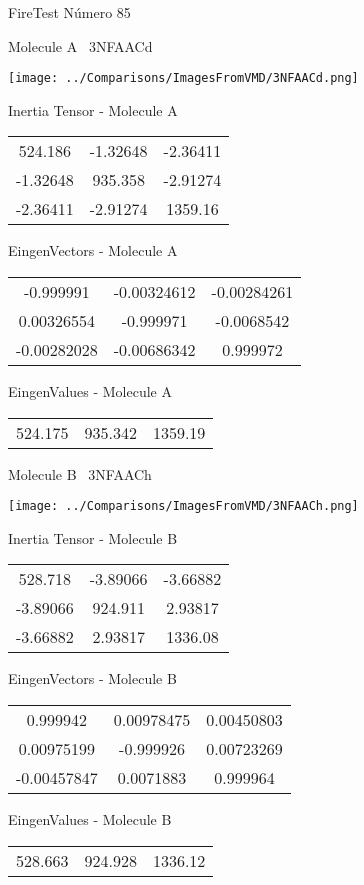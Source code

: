 \vtab[-3cm]
\begin{center}
{\large FireTest \tab Número 85}
\end{center}
\begin{multicols}{2}
\begin{center}

Molecule A \
3NFAACd

\texttt{[image: ../Comparisons/ImagesFromVMD/3NFAACd.png]}

Inertia Tensor - Molecule A \\
\begin{tabular}{|c c c|}
524.186	 & 	-1.32648	 & 	-2.36411	 \\
-1.32648	 & 	935.358	 & 	-2.91274	 \\
-2.36411	 & 	-2.91274	 & 	1359.16
\end{tabular}

\vtab
 EingenVectors - Molecule A     \\
\begin{tabular}{|c c c|}
-0.999991	 & 	-0.00324612	 & 	-0.00284261	 \\
0.00326554	 & 	-0.999971	 & 	-0.0068542	 \\
-0.00282028	 & 	-0.00686342	 & 	0.999972
\end{tabular}

\vtab
 EingenValues - Molecule A     \\
\begin{tabular}{|c c c|}
524.175	 & 	935.342	 & 	1359.19	 \\
\end{tabular}
\columnbreak

Molecule B \
3NFAACh

\texttt{[image: ../Comparisons/ImagesFromVMD/3NFAACh.png]}

Inertia Tensor - Molecule B \\
\begin{tabular}{|c c c|}
528.718	 & 	-3.89066	 & 	-3.66882	 \\
-3.89066	 & 	924.911	 & 	2.93817	 \\
-3.66882	 & 	2.93817	 & 	1336.08
\end{tabular}

\vtab
 EingenVectors - Molecule B     \\
\begin{tabular}{|c c c|}
0.999942	 & 	0.00978475	 & 	0.00450803	 \\
0.00975199	 & 	-0.999926	 & 	0.00723269	 \\
-0.00457847	 & 	0.0071883	 & 	0.999964
\end{tabular}

\vtab
 EingenValues - Molecule B     \\
\begin{tabular}{|c c c|}
528.663	 & 	924.928	 & 	1336.12	 \\
\end{tabular}

\end{center}
\end{multicols}

